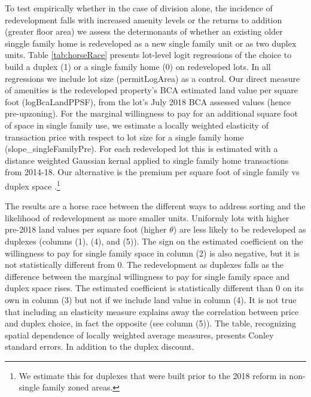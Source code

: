 \documentclass[12pt]{article}
\begin{document}
To test empirically whether in the case of division alone, the incidence of redevelopment falls with increased amenity levels or the returns to addition (greater floor area) we assess the determonants of whether an existing older singgle family home is redeveloped as a new single family unit or as two duplex units. Table \ref{tab:horseRace} presents lot-level logit regressions of the choice to build a duplex (1) or a single family home (0) on redeveloped lots. In all regressions we include lot size (permitLogArea) as a control. Our direct measure of amenities is the redeveloped property's BCA estimated land value per square foot (logBcaLandPPSF), from the lot's July 2018 BCA assessed values (hence pre-upzoning). For the marginal willingness to pay for an additional square foot of space in single family use, we estimate a locally weighted elasticity of transaction price with respect to lot size for a single family home (slope_singleFamilyPre). For each redeveloped lot this is estimated with a distance weighted Gaussian kernal applied to single family home transactions from 2014-18. Our alternative is the premium per square foot of single family vs duplex space .\footnote{We estimate this for duplexes that were built prior to the 2018 reform in non-single family zoned areas.} 

The results are a horse race between the different ways to address sorting and the likelihood of redevelopment as more smaller units. Uniformly lots with higher pre-2018 land values per square foot (higher $\theta$) are less likely to be redeveloped as duplexes (columns (1), (4), and (5)). The sign on the estimated coefficient on the willingness to pay for single family space in column (2) is also negative, but it is not statistically different from 0. The redevelopment as duplexes falls as the difference between the marginal willingness to pay for single family space and duplex space rises. The estimated coefficient is statistically different than 0 on its own in column (3) but not if we include land value in column (4). It is not true that including an elasticity measure explains away the correlation between price and duplex choice, in fact the opposite (see column (5)). The table, recognizing spatial dependence of locally weighted average measures, presents Conley standard errors. In addition to the duplex discount. 
\end{document}
